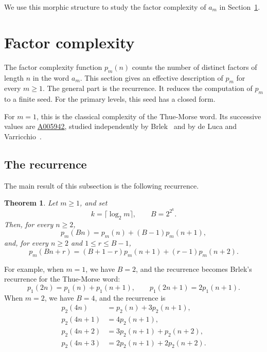 \documentclass[12pt,reqno]{article}
\newcommand{\seqnum}[1]{\href{https://oeis.org/#1}{\rm \underline{#1}}}
\theoremstyle{plain}
\newtheorem{theorem}{Theorem}[section]
\theoremstyle{definition}
\begin{document}
We use this morphic structure to study the factor complexity of $a_m$ in Section~\ref{sec:complexity}.

\section{Factor complexity}
\label{sec:complexity}

The factor complexity function \(p_m(n)\) counts the number of distinct
factors of length \(n\) in the word \(a_m\). This section gives an effective
description of \(p_m\) for every \(m\ge1\). The general part is the
recurrence. It reduces the computation of \(p_m\) to a finite seed. For
the primary levels, this seed has a closed form.

For \(m=1\), this is the classical complexity of the Thue-Morse word. Its
successive values are \seqnum{A005942}, studied independently by
Brlek~\cite{Brlek1989} and by de Luca and
Varricchio~\cite{deLucaVarricchio1989}.

\subsection{The recurrence}
\label{subsec:complexity-recurrence}

The main result of this subsection is the following recurrence.

\begin{theorem}
\label{thm:complexity-recurrence}
Let \(m\ge1\), and set
\[
  k=\lceil\log_2 m\rceil,\qquad B=2^{2^k}.
\]
Then, for every \(n\ge2\),
\begin{equation}
\label{eq:univ-r0}
  p_m(Bn)=p_m(n)+(B-1)p_m(n+1),
\end{equation}
and, for every \(n\ge2\) and \(1\le r\le B-1\),
\begin{equation}
\label{eq:univ-rne0}
  p_m(Bn+r)=(B+1-r)p_m(n+1)+(r-1)p_m(n+2).
\end{equation}
\end{theorem}

For example, when \(m=1\), we have \(B=2\), and the recurrence becomes
Brlek's recurrence for the Thue-Morse word:
\[
  p_1(2n)=p_1(n)+p_1(n+1),\qquad
  p_1(2n+1)=2p_1(n+1).
\]
When \(m=2\), we have \(B=4\), and the recurrence is
\begin{align*}
  p_2(4n) &= p_2(n) + 3p_2(n+1), \\
  p_2(4n+1) &= 4p_2(n+1), \\
  p_2(4n+2) &= 3p_2(n+1) + p_2(n+2), \\
  p_2(4n+3) &= 2p_2(n+1) + 2p_2(n+2).
\end{align*}
\end{document}
